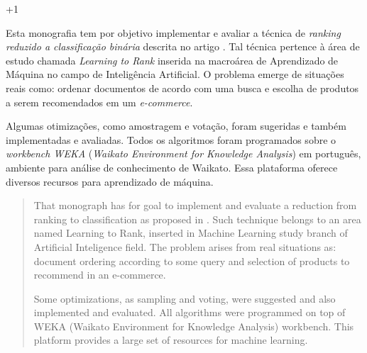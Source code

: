\documentclass[12pt, a4paper, normaltoc, capchap, capsec, times]{abnt}
\begin{document}
\looseness+1


\capa
\folhaderosto

\begin{resumo}
Esta monografia tem por objetivo implementar e avaliar a técnica de \emph{ranking reduzido a classificação binária} descrita no artigo \cite{langford08}. Tal técnica pertence à área de estudo chamada \emph{Learning to Rank} inserida na macroárea de Aprendizado de Máquina no campo de Inteligência Artificial. O problema emerge de situações reais como: ordenar documentos de acordo com uma busca e escolha de produtos a serem recomendados em um \emph{e-commerce}.

Algumas otimizações, como amostragem e votação, foram sugeridas e também implementadas e avaliadas. Todos os algoritmos foram programados sobre o \emph{workbench WEKA} (\emph{Waikato Environment for Knowledge Analysis}) em português, ambiente para análise de conhecimento de Waikato. Essa plataforma oferece diversos recursos para aprendizado de máquina.

\end{resumo}

\begin{abstract}
That monograph has for goal to implement and evaluate a reduction from ranking to classification as proposed in \cite{langford08}. Such technique belongs to an area named Learning to Rank, inserted in Machine Learning study branch of Artificial Inteligence field. The problem arises from real situations as: document ordering according to some query and selection of products to recommend in an e-commerce.

Some optimizations, as sampling and voting, were suggested and also implemented and evaluated. All algorithms were programmed on top of WEKA (Waikato Environment for Knowledge Analysis) workbench. This platform provides a large set of resources for machine learning.

\end{abstract}

\linespread{0.9}
    \sumario
\linespread{1}

\ProximoForaDoSumario
\listadefiguras
\end{document}
